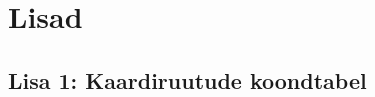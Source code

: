\section*{Lisad} \label{lisad} 

\subsection*{Lisa 1: Kaardiruutude koondtabel}
\label{lisa:kaardiruudud}

\enlargethispage{1.5cm} %

\begin{center}
    \footnotesize %
    \renewcommand{\arraystretch}{1.1} %
    
    \label{tbl:laz_per_mapsheet}
    

\end{center}
